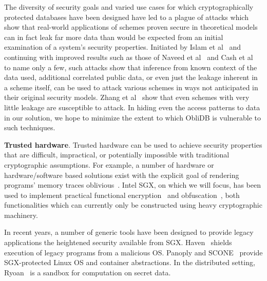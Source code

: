 \documentclass[letterpaper,twocolumn,10pt]{article}
\def\name/{ObliDB}
\begin{document}
The diversity of security goals and varied use cases for which cryptographically protected databases have been designed have led to a plague of attacks which show that real-world applications of schemes proven secure in theoretical models can in fact leak far more data than would be expected from an initial examination of a system's security properties. Initiated by Islam et al~\cite{IKK12} and continuing with improved results such as those of Naveed et al~\cite{NKW15} and Cash et al~\cite{CGPR15} to name only a few, such attacks show that inference from known context of the data used, additional correlated public data, or even just the leakage inherent in a scheme itself, can be used to attack various schemes in ways not anticipated in their original security models. Zhang et al~\cite{ZKP16} show that even schemes with very little leakage are susceptible to attack. In hiding even the access patterns to data in our solution, we hope to minimize the extent to which \name/ is vulnerable to such techniques.

  \noindent \textbf{Trusted hardware}.
Trusted hardware can be used to achieve security properties that are difficult, impractical, or potentially impossible with traditional cryptographic assumptions. For example, a number of hardware or hardware/software based solutions exist with the explicit goal of rendering programs' memory traces oblivious~\cite{CLD16, LHM+15, MLS+13}. Intel SGX, on which we will focus, has been used to implement practical functional encryption~\cite{FVBG16} and obfuscation~\cite{NFR+17}, both functionalities which can currently only be constructed using heavy cryptographic machinery.

In recent years, a number of generic tools have been designed to provide legacy applications the heightened security available from SGX. Haven~\cite{BPH15} shields execution of legacy programs from a malicious OS. Panoply and SCONE~\cite{STTS17, ATG+16} provide SGX-protected Linux OS and container abstractions. In the distributed setting, Ryoan~\cite{HZX+16} is a sandbox for computation on secret data.
\end{document}
